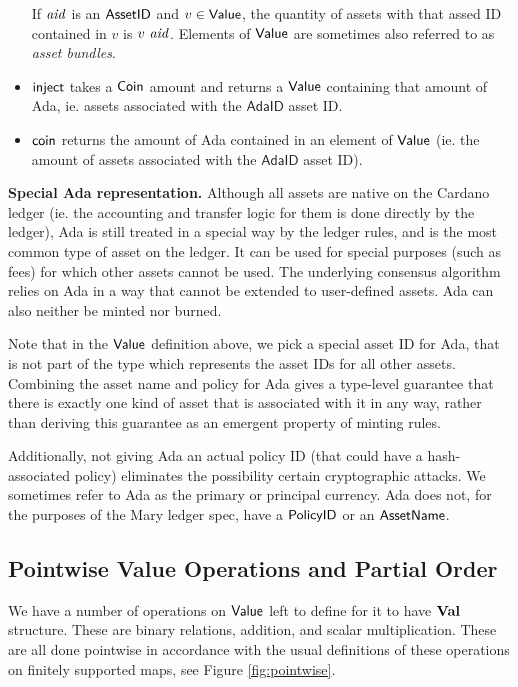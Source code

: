 \begin{itemize}
    If $\mathit{aid}$ is an $\mathsf{AssetID}$ and $v \in \mathsf{Value}$,
    the quantity of assets with that assed ID contained in $v$ is $v~\mathit{aid}$.
    Elements of $\mathsf{Value}$ are sometimes also referred to as
    \emph{asset bundles}.

  \item $\mathsf{inject}$ takes a $\mathsf{Coin}$ amount and returns a $\mathsf{Value}$ containing
  that amount of Ada, ie. assets associated with the $\mathsf{AdaID}$ asset ID.

  \item $\mathsf{coin}$ returns the amount of Ada contained in an element of $\mathsf{Value}$ (ie.
  the amount of assets associated with the $\mathsf{AdaID}$ asset ID).
\end{itemize}

\noindent \textbf{Special Ada representation.}
Although all assets are native on the Cardano ledger (ie. the accounting and
transfer logic for them is done directly by the ledger), Ada is still treated in a
special way by the ledger rules, and is the most common type of asset on the ledger.
It can
be used for special purposes (such as fees) for which other assets cannot be used.
The underlying consensus algorithm relies on Ada in a way that
cannot be extended to user-defined assets.
Ada can also neither be minted nor burned.

Note that in the $\mathsf{Value}$ definition above, we pick a special asset ID for Ada, that
is not part of the type which represents the asset IDs for all other assets.
Combining the asset name and policy for Ada gives a type-level guarantee that there is exactly
one kind of asset that is associated with it in any way, rather than
deriving this guarantee as an emergent property of minting rules.

Additionally, not giving Ada an actual policy ID
(that could have a hash-associated policy) eliminates the possibility
certain cryptographic attacks.
We sometimes refer to Ada as the primary or principal currency. Ada does not,
for the purposes of the Mary ledger spec, have a $\mathsf{PolicyID}$ or an $\mathsf{AssetName}$.

\subsection{Pointwise Value Operations and Partial Order}

We have a number of operations on $\mathsf{Value}$ left to define for it to have
$\mathbf{Val}$ structure. These are binary relations, addition, and
scalar multiplication. These are all done
pointwise in accordance with the usual definitions of these operations on
finitely supported maps, see Figure \ref{fig:pointwise}.

